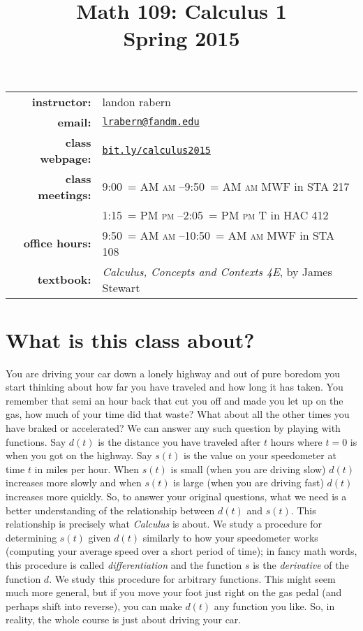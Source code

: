 \documentclass[12pt]{article}
\title{Math 109: Calculus 1\\ \bigskip\small{Spring 2015}}
\date{}
\makeatletter
\DeclareRobustCommand{\maybefakesc}[1]{%
  \ifnum\pdfstrcmp{\f@series}{\bfdefault}=\z@
    {\fontsize{\dimexpr0.8\dimexpr\f@size pt\relax}{0}\selectfont\uppercase{#1}}%
  \else
    \textsc{#1}%
  \fi
}
\newcommand\AM{\,\maybefakesc{am}\xspace}
\newcommand\PM{\,\maybefakesc{pm}\xspace}
\makeatother
\begin{document}
\maketitle

\begin{tabular}{r l}
\textbf{instructor:}& landon rabern\\
\textbf{email:}& \href{mailto:lrabern@fandm.edu}{\nolinkurl{lrabern@fandm.edu}}\\
\textbf{class webpage:}& \href{http://bit.ly/calculus2015}{\nolinkurl{bit.ly/calculus2015}}\\
\textbf{class meetings:}& 9:00\AM--9:50\AM MWF in STA 217\\
& 1:15\PM--2:05\PM T in HAC 412\\
\textbf{office hours:}& 9:50\AM--10:50\AM MWF in STA 108\\
\textbf{textbook:}&\textit{Calculus, Concepts and Contexts 4E}, by James Stewart\\
\end{tabular}

\section*{What is this class about?}
You are driving your car down a lonely highway and out of pure boredom you start thinking about how far you have traveled and how long it has taken.  You remember
that semi an hour back that cut you off and made you let up on the gas, how much of your time did that waste?  What about all the other times you have braked or accelerated?
We can answer any such question by playing with functions.  Say $d(t)$ is the distance you have traveled after $t$ hours where $t = 0$ is when you got on the highway.   Say $s(t)$ is the value on your speedometer at time $t$ in miles per hour.  When $s(t)$ is small (when you are driving slow) $d(t)$ increases more slowly and when $s(t)$ is large (when you are driving fast) $d(t)$ increases more quickly.  So, to answer your original questions, what we need is a better understanding of the relationship between $d(t)$ and $s(t)$. This relationship is precisely what \emph{Calculus} is about. We study a procedure for determining $s(t)$ given $d(t)$ similarly to how your speedometer works (computing your average speed over a short period of time); in fancy math words, this procedure is called \emph{differentiation} and the function $s$ is the \emph{derivative} of the function $d$. We study this procedure for arbitrary functions. This might seem much more general, but if you move your foot just right on the gas pedal (and perhaps shift into reverse), you can make $d(t)$ any function you like.  So, in reality, the whole course is just about driving your car.
\end{document}
